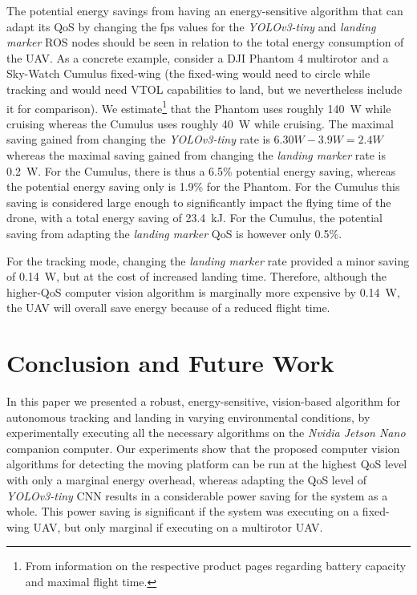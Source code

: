 \documentclass[conference]{IEEEtran}
\begin{document}
The potential energy savings from having an energy-sensitive algorithm
that can adapt its QoS by changing the fps values for the
\emph{YOLOv3-tiny} and \emph{landing marker} ROS nodes should be seen
in relation to the total energy consumption of the UAV. As a concrete
example, consider a DJI Phantom 4 multirotor and a Sky-Watch Cumulus
fixed-wing (the fixed-wing would need to circle while tracking and 
would need VTOL capabilities to land, but we nevertheless include it 
for comparison). We estimate\footnote{From information on the respective
  product pages regarding battery capacity and maximal flight time.}
that the Phantom uses roughly \SI{140}{\watt} while cruising whereas the Cumulus
uses roughly \SI{40}{\watt} while cruising. The maximal saving gained from
changing the \emph{YOLOv3-tiny} rate is $6.30W-3.9W=2.4W$ whereas the
maximal saving gained from changing the \emph{landing marker} rate is
\SI{0.2}{\watt}. For the Cumulus, there is thus a 6.5\% potential energy
saving, whereas the potential energy saving only is 1.9\% for the
Phantom. For the Cumulus this saving is considered large enough to
significantly impact the flying time of the drone, with a total energy
saving of \SI{23.4}{\kilo \joule}. For the Cumulus, the potential saving from adapting
the \emph{landing marker} QoS is however only 0.5\%. 

For the tracking mode, changing the \emph{landing marker} rate
provided a minor saving of \SI{0.14}{\watt}, but at the cost of increased
landing time. Therefore, although the higher-QoS computer vision
algorithm is marginally more expensive by \SI{0.14}{\watt}, the UAV will
overall save energy because of a reduced flight time.

\section{Conclusion and Future Work}
\label{sec:conclusion}

In this paper we presented a robust, energy-sensitive, vision-based
algorithm for autonomous tracking and landing in varying environmental
conditions, by experimentally executing all the necessary algorithms on the \emph{Nvidia Jetson Nano} companion computer.
%
Our experiments show that the proposed computer vision algorithms for detecting the moving platform can be run at the highest QoS level with only a marginal
energy overhead, whereas adapting the QoS level of \emph{YOLOv3-tiny} CNN results in a considerable power saving for the system as a whole. This power saving is significant if the system was executing on a fixed-wing UAV, %
but only marginal if executing on a multirotor UAV.
\end{document}
